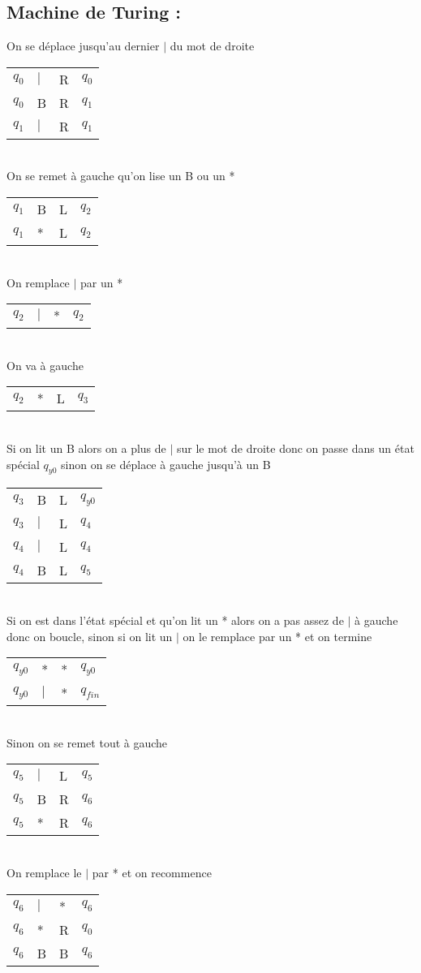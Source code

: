 \documentclass{report}
\begin{document}
\subsection*{Machine de Turing :}

On se déplace jusqu'au dernier $|$ du mot de droite

\begin{tabular}{llll}
$q_0$ & $|$ & R & $q_0$ \\
$q_0$ & B & R & $q_1$ \\
$q_1$ & $|$ & R & $q_1$ \\
\end{tabular}\\

On se remet à gauche qu'on lise un B ou un *

\begin{tabular}{llll}
$q_1$ & B & L & $q_2$ \\
$q_1$ & * & L & $q_2$
\end{tabular}\\

On remplace $|$ par un *

\begin{tabular}{llll}
$q_2$ & $|$ & * & $q_2$
\end{tabular}\\

On va à gauche

\begin{tabular}{llll}
$q_2$ & * & L & $q_3$
\end{tabular}\\

Si on lit un B alors on a plus de $|$ sur le mot de droite donc on passe dans un état spécial $q_{y0}$ sinon on se déplace à gauche jusqu'à un B

\begin{tabular}{llll}
$q_3$ & B & L & $q_{y0}$ \\
$q_3$ & $|$ & L & $q_4$ \\
$q_4$ & $|$ & L & $q_4$ \\
$q_4$ & B & L & $q_5$
\end{tabular}\\

Si on est dans l'état spécial et qu'on lit un * alors on a pas assez de $|$ à gauche donc on boucle, sinon si on lit un $|$ on le remplace par un * et on termine

\begin{tabular}{llll}
$q_{y0}$ & * & * & $q_{y0}$ \\
$q_{y0}$ & $|$ & * & $q_{fin}$
\end{tabular}\\

Sinon on se remet tout à gauche

\begin{tabular}{llll}
$q_5$ & $|$ & L & $q_5$ \\
$q_5$ & B & R & $q_6$ \\
$q_5$ & * & R & $q_6$
\end{tabular}\\

On remplace le $|$ par * et on recommence

\begin{tabular}{llll}
$q_6$ & $|$ & * & $q_6$ \\
$q_6$ & * & R & $q_0$ \\
$q_6$ & B & B & $q_6$
\end{tabular}
\end{document}
